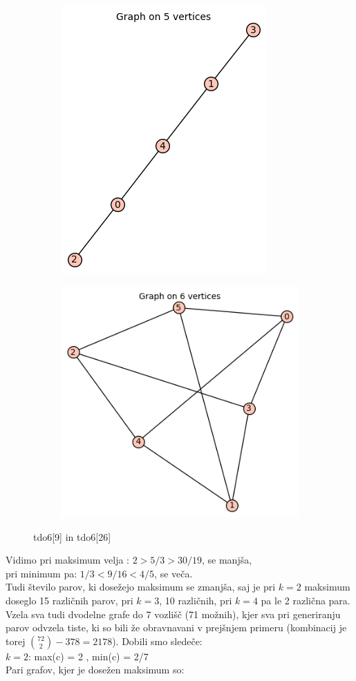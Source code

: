 \documentclass[12pt, a4paper]{article}
\begin{document}
\begin{center}
\begin{figure}[!htb]
\centering
\begin{subfigure}{0.5\textwidth}
  \centering
  \includegraphics[width=0.34\linewidth]{tdo6[9]}
\end{subfigure}%
\begin{subfigure}{0.5\textwidth}
  \centering
  \includegraphics[width=0.45\linewidth]{tdo6[26]}
\end{subfigure}
\caption{tdo6[9] in tdo6[26]}
\label{fig:test}
\end{figure}

\end{center}
Vidimo pri maksimum velja : $2>5/3>30/19$, se manjša, \\
pri minimum pa: $1/3<9/16<4/5$, se veča. \\
Tudi število parov, ki dosežejo maksimum se zmanjša, saj je pri $k=2$ maksimum doseglo 15 različnih parov, pri $k=3$, 10 različnih, pri $k=4$ pa le 2 različna para. \vspace{4mm} \\
Vzela sva tudi dvodelne grafe do 7 vozlišč (71 možnih), kjer sva pri generiranju parov odvzela tiste, ki so bili že obravnavani v prejšnjem primeru (kombinacij je torej $\binom{72}{2} - 378=2178$). Dobili smo sledeče: \\
$k=2$:  max(c) = 2 , min(c) = 2/7 \\
Pari grafov, kjer je dosežen maksimum so:
\end{document}
